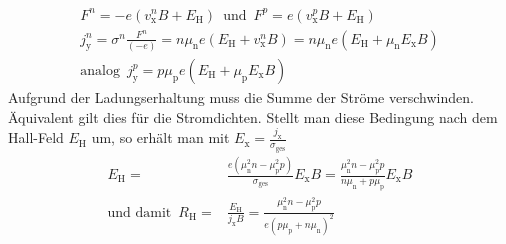 \documentclass[numbers=noenddot,14pt,a4paper]{scrartcl}
\newcommand{\ix}[1]{_\text{#1}}
\begin{document}
\begin{align}
	F^n=-e\left(v\ix{x}^nB+E\ix{H}\right)\,\,\, \text{und}\,\,\,	F^p=e\left(v\ix{x}^pB+E\ix{H}\right) \nonumber \\
	j\ix{y}^n=\sigma^n\frac{F^n}{(-e)}=n\mu\ix{n}e\left(E\ix{H}+v\ix{x}^nB\right)=n\mu\ix{n}e\left(E\ix{H}+\mu\ix{n}E\ix{x}B\right) \nonumber \\ \text{analog}\,\,\,j\ix{y}^p=p\mu\ix{p}e\left(E\ix{H}+\mu\ix{p}E\ix{x}B\right) \nonumber
\end{align}
Aufgrund der Ladungserhaltung muss die Summe der Ströme verschwinden. Äquivalent gilt dies für die Stromdichten. Stellt man diese Bedingung nach dem Hall-Feld $E\ix{H}$ um, so erhält man mit $E\ix{x}=\frac{j\ix{x}}{\sigma\ix{ges}}$
\begin{align}
	E\ix{H}=&\frac{e\left(\mu\ix{n}^2n-\mu\ix{p}^2p\right)}{\sigma\ix{ges}}E\ix{x}B=\frac{\mu\ix{n}^2n-\mu\ix{p}^2p}{n\mu\ix{n}+p\mu\ix{p}}E\ix{x}B \nonumber \\
	\text{und damit} \,\,\, R\ix{H}=&\frac{E\ix{H}}{j\ix{x}B}=\frac{\mu\ix{n}^2n-\mu\ix{p}^2p}{e\left(p\mu\ix{p}+n\mu\ix{n}\right)^2} \label{eq:hall-konst}
\end{align}
\newpage
\end{document}
